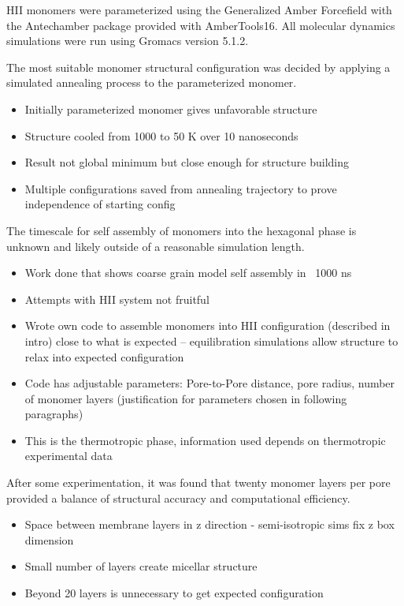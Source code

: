 \documentclass{article}
\begin{document}
	HII monomers were parameterized using the Generalized Amber Forcefield with the Antechamber package provided with AmberTools16. All molecular dynamics simulations were run using Gromacs version 5.1.2.
	
	The most suitable monomer structural configuration was decided by applying a simulated annealing process to the parameterized monomer. 
	\begin{itemize}
		\item Initially parameterized monomer gives unfavorable structure
		\item Structure cooled from 1000 to 50 K over 10 nanoseconds
		\item Result not global minimum but close enough for structure building
		\item Multiple configurations saved from annealing trajectory to prove independence of starting config
	\end{itemize}
	
	The timescale for self assembly of monomers into the hexagonal phase is unknown and likely outside of a reasonable simulation length. 
	\begin{itemize}
		\item Work done that shows coarse grain model self assembly in ~1000 ns
		\item Attempts with HII system not fruitful
		\item Wrote own code to assemble monomers into HII configuration (described in intro) close to what is expected -- equilibration simulations allow structure to relax into expected configuration 
		\item Code has adjustable parameters: Pore-to-Pore distance, pore radius, number of monomer layers (justification for parameters chosen in following paragraphs)
		\item This is the thermotropic phase, information used depends on thermotropic experimental data
	\end{itemize}
	
	After some experimentation, it was found that twenty monomer layers per pore provided a balance of structural accuracy and computational efficiency. 
	\begin{itemize}
		\item Space between membrane layers in z direction - semi-isotropic sims fix z box dimension
		\item Small number of layers create micellar structure
		\item Beyond 20 layers is unnecessary to get expected configuration
	\end{itemize}
	
\end{document}
